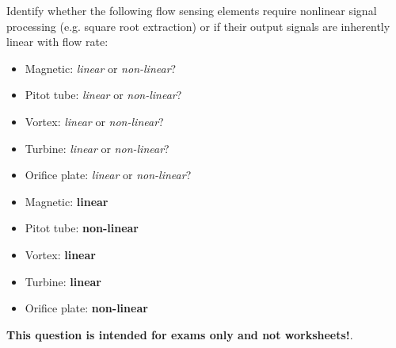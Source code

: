 

Identify whether the following flow sensing elements require nonlinear signal processing (e.g. square root extraction) or if their output signals are inherently linear with flow rate:

\begin{itemize}
\item{} Magnetic: {\it linear} or {\it non-linear}?
\vskip 5pt
\item{} Pitot tube: {\it linear} or {\it non-linear}?
\vskip 5pt
\item{} Vortex: {\it linear} or {\it non-linear}? 
\vskip 5pt
\item{} Turbine: {\it linear} or {\it non-linear}?
\vskip 5pt
\item{} Orifice plate: {\it linear} or {\it non-linear}?
\end{itemize}







\begin{itemize}
\item{} Magnetic: {\bf linear}
\vskip 5pt
\item{} Pitot tube: {\bf non-linear}
\vskip 5pt
\item{} Vortex: {\bf linear}
\vskip 5pt
\item{} Turbine: {\bf linear}
\vskip 5pt
\item{} Orifice plate: {\bf non-linear}
\end{itemize}







{\bf This question is intended for exams only and not worksheets!}.



